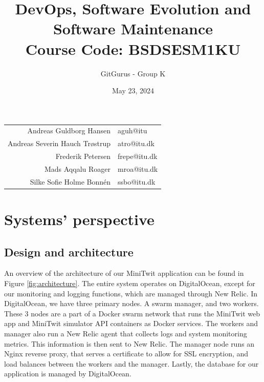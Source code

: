 \documentclass{article}
\title{DevOps, Software Evolution and Software Maintenance\\
\large Course Code: BSDSESM1KU}
\author{GitGurus - Group K}
\date{May 23, 2024}
\begin{document}
\maketitle
\thispagestyle{empty}
\setcounter{page}{0}
\vspace{2cm}

\begin{table}[H]
    \centering
    \begin{tabular}{r|l}
    Andreas Guldborg Hansen & aguh@itu \\
    Andreas Severin Hauch Trøstrup & atro@itu.dk \\
    Frederik Petersen & frepe@itu.dk \\
    Mads Aqqalu Roager & mroa@itu.dk \\
    Silke Sofie Holme Bonnén & ssbo@itu.dk
    \end{tabular}
\end{table}

\newpage
\tableofcontents

\newpage


\section{Systems' perspective}
\subsection{Design and architecture}
An overview of the architecture of our MiniTwit application can be found in Figure \ref{fig:architecture}. 
The entire system operates on DigitalOcean, except for our monitoring and logging functions, which are managed through New Relic. In DigitalOcean, we have three primary nodes. A swarm manager, and two workers. These 3 nodes are a part of a Docker swarm network that runs the MiniTwit web app and MiniTwit simulator API containers as Docker services.
The workers and manager also run a New Relic agent that collects logs and system monitoring metrics. This information is then sent to New Relic.
The manager node runs an Nginx reverse proxy, that serves a certificate to allow for SSL encryption, and load balances between the workers and the manager.
Lastly, the database for our application is managed by DigitalOcean.
\end{document}
